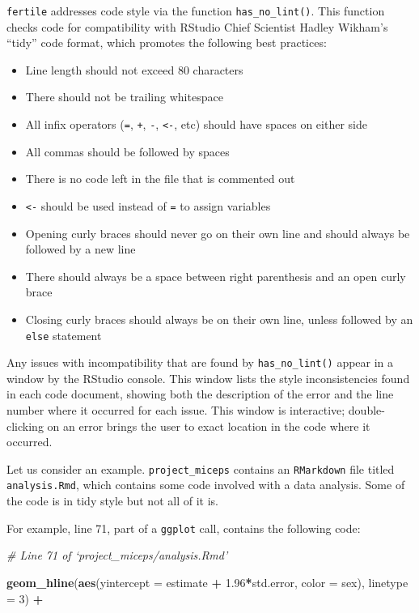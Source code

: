 \documentclass[12pt,twoside]{reedthesis}
\newenvironment{Shaded}{\begin{snugshade}}{\end{snugshade}}
\newcommand{\KeywordTok}[1]{\textcolor[rgb]{0.13,0.29,0.53}{\textbf{#1}}}
\newcommand{\DataTypeTok}[1]{\textcolor[rgb]{0.13,0.29,0.53}{#1}}
\newcommand{\DecValTok}[1]{\textcolor[rgb]{0.00,0.00,0.81}{#1}}
\newcommand{\FloatTok}[1]{\textcolor[rgb]{0.00,0.00,0.81}{#1}}
\newcommand{\StringTok}[1]{\textcolor[rgb]{0.31,0.60,0.02}{#1}}
\newcommand{\CommentTok}[1]{\textcolor[rgb]{0.56,0.35,0.01}{\textit{#1}}}
\newcommand{\OperatorTok}[1]{\textcolor[rgb]{0.81,0.36,0.00}{\textbf{#1}}}
\newcommand{\NormalTok}[1]{#1}
\providecommand{\tightlist}{%
  \setlength{\itemsep}{0pt}\setlength{\parskip}{0pt}}
\begin{document}
\texttt{fertile} addresses code style via the function
\texttt{has\_no\_lint()}. This function checks code for compatibility
with RStudio Chief Scientist Hadley Wikham's ``tidy'' code format, which
promotes the following best practices:
\begin{itemize}
\tightlist
\item
  Line length should not exceed 80 characters
\item
  There should not be trailing whitespace
\item
  All infix operators (\texttt{=}, \texttt{+}, \texttt{-},
  \texttt{\textless{}-}, etc) should have spaces on either side
\item
  All commas should be followed by spaces
\item
  There is no code left in the file that is commented out
\item
  \texttt{\textless{}-} should be used instead of \texttt{=} to assign
  variables
\item
  Opening curly braces should never go on their own line and should
  always be followed by a new line
\item
  There should always be a space between right parenthesis and an open
  curly brace
\item
  Closing curly braces should always be on their own line, unless
  followed by an \texttt{else} statement
\end{itemize}
Any issues with incompatibility that are found by
\texttt{has\_no\_lint()} appear in a window by the RStudio console. This
window lists the style inconsistencies found in each code document,
showing both the description of the error and the line number where it
occurred for each issue. This window is interactive; double-clicking on
an error brings the user to exact location in the code where it
occurred.

Let us consider an example. \texttt{project\_miceps} contains an
\texttt{RMarkdown} file titled \texttt{analysis.Rmd}, which contains
some code involved with a data analysis. Some of the code is in tidy
style but not all of it is.

For example, line 71, part of a \texttt{ggplot} call, contains the
following code:

\footnotesize
\begin{Shaded}
\begin{Highlighting}[]
\CommentTok{# Line 71 of `project_miceps/analysis.Rmd'}

\KeywordTok{geom_hline}\NormalTok{(}\KeywordTok{aes}\NormalTok{(}\DataTypeTok{yintercept =}\NormalTok{ estimate }\OperatorTok{+}\StringTok{ }\FloatTok{1.96}\OperatorTok{*}\NormalTok{std.error, }\DataTypeTok{color =}\NormalTok{ sex), }\DataTypeTok{linetype =} \DecValTok{3}\NormalTok{) }\OperatorTok{+}\StringTok{ }
\end{Highlighting}
\end{Shaded}
\normalsize
\end{document}
